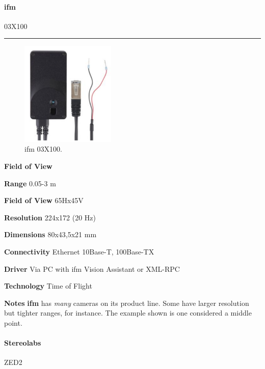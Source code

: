 \documentclass[../main.tex]{subfiles}
\begin{document}
\vspace{1em}
\paragraph{\large \textbf{ifm}} {\large 03X100}

\noindent\rule{8cm}{0.1pt}
\begin{figure}[H]
    \centering
    \includegraphics[width=0.4\textwidth]{images/ifm03X100.png}
    \caption{ifm 03X100.}
    \label{fig:ifm03X100}
\end{figure}
\begin{labeling}{\textbf{Field of View    }}
    \setlength{\itemindent}{2em}
    \item [\textbf{Range}] 0.05-3 m
    \item [\textbf{Field of View}] 65Hx45V
    \item [\textbf{Resolution}] 224x172 (20 Hz)
    \item [\textbf{Dimensions}] 80x43,5x21 mm
    \item [\textbf{Connectivity}] Ethernet 10Base-T, 100Base-TX
    \item [\textbf{Driver}] Via PC with ifm Vision Assistant or XML-RPC
    \item [\textbf{Technology}] Time of Flight
    \item [\textbf{Notes}] \textbf{ifm} has \emph{many} cameras on its product line. Some have larger resolution but tighter ranges, for instance. The example shown is one considered a middle point.
\end{labeling}
\vspace{1em}
\paragraph{\large \textbf{Stereolabs}} {\large ZED2}
\end{document}
